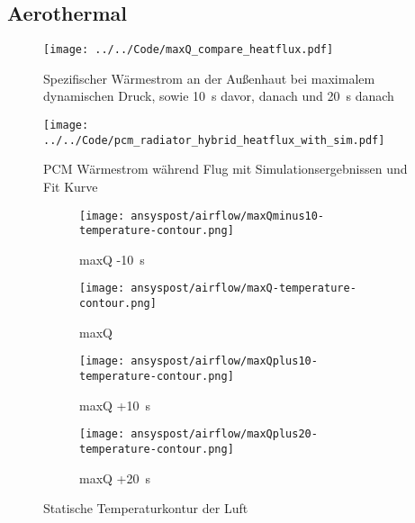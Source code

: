 \subsection{Aerothermal}

\begin{figure}[H]
  \centering
  \texttt{[image: ../../Code/maxQ\_compare\_heatflux.pdf]}
  \caption{Spezifischer Wärmestrom an der Außenhaut bei maximalem dynamischen Druck, sowie \SI{10}{s} davor, danach und \SI{20}{s} danach}\label{fig:spezifischer_waermestrom_maxQ_simulationen}
\end{figure}
\begin{figure}[H]
  \centering
  \texttt{[image: ../../Code/pcm\_radiator\_hybrid\_heatflux\_with\_sim.pdf]}
  \caption{PCM Wärmestrom während Flug mit Simulationsergebnissen und Fit Kurve}\label{fig:pcm_waermestrom_sim}
\end{figure}

\begin{figure}[H]
    \centering

    \begin{subfigure}{\textwidth}
        \centering
        \texttt{[image: ansyspost/airflow/maxQminus10-temperature-contour.png]}
        \caption{maxQ -\SI{10}{\second}}
        \label{fig:maxQminus10_temp_contour}
    \end{subfigure}

    \begin{subfigure}{\textwidth}
        \centering
        \texttt{[image: ansyspost/airflow/maxQ-temperature-contour.png]}
        \caption{maxQ}
        \label{fig:maxQ_temp_contour}
    \end{subfigure}

    \begin{subfigure}{\textwidth}
        \centering
        \texttt{[image: ansyspost/airflow/maxQplus10-temperature-contour.png]}
        \caption{maxQ +\SI{10}{\second}}
        \label{fig:maxQplus10_temp_contour}
    \end{subfigure}

    \begin{subfigure}{\textwidth}
        \centering
        \texttt{[image: ansyspost/airflow/maxQplus20-temperature-contour.png]}
        \caption{maxQ +\SI{20}{\second}}
        \label{fig:maxQplus20_temp_contour}
    \end{subfigure}

    \caption{Statische Temperaturkontur der Luft}
    \label{fig:airflow_temp_contour}
\end{figure}

